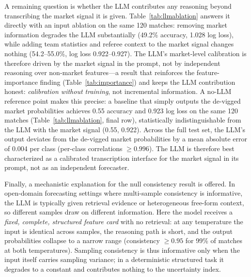 A remaining question is whether the LLM contributes any reasoning
beyond transcribing the market signal it is given. Table~\ref{tab:llmablation}
answers it directly with an input ablation on the same 120 matches:
removing market information degrades the LLM substantially
(49.2\% accuracy, 1.028 log loss), while adding team statistics and
referee context to the market signal changes nothing (54.2--55.0\%,
log loss 0.922--0.927). The LLM's market-level calibration is
therefore driven by the market signal in the prompt, not by
independent reasoning over non-market features---a result that
reinforces the feature-importance finding (Table~\ref{tab:importance})
and keeps the LLM contribution honest: \emph{calibration without
training}, not incremental information. A no-LLM reference point
makes this precise: a baseline that simply outputs the de-vigged
market probabilities achieves 0.55 accuracy and 0.923 log loss on
the same 120 matches (Table~\ref{tab:llmablation}, final row),
statistically indistinguishable from the LLM with the market signal
(0.55, 0.922). Across the full test set, the LLM's output deviates
from the de-vigged market probabilities by a mean absolute error of
0.004 per class (per-class correlations $\geq 0.996$). The LLM is
therefore best characterized as a calibrated transcription interface
for the market signal in its prompt, not as an independent
forecaster.

Finally, a mechanistic explanation for the null
consistency result is offered. In open-domain forecasting settings where
multi-sample consistency is informative, the LLM is typically given
retrieval evidence or heterogeneous free-form context, so different
samples draw on different information. Here the model receives a
\emph{fixed, complete, structured feature card} with no retrieval: at
any temperature the input is identical across samples, the reasoning
path is short, and the output probabilities collapse to a narrow
range (consistency $\geq 0.95$ for 99\% of matches at both
temperatures). Sampling consistency is thus informative only when the
input itself carries sampling variance; in a deterministic structured
task it degrades to a constant and contributes nothing to the
uncertainty index.
